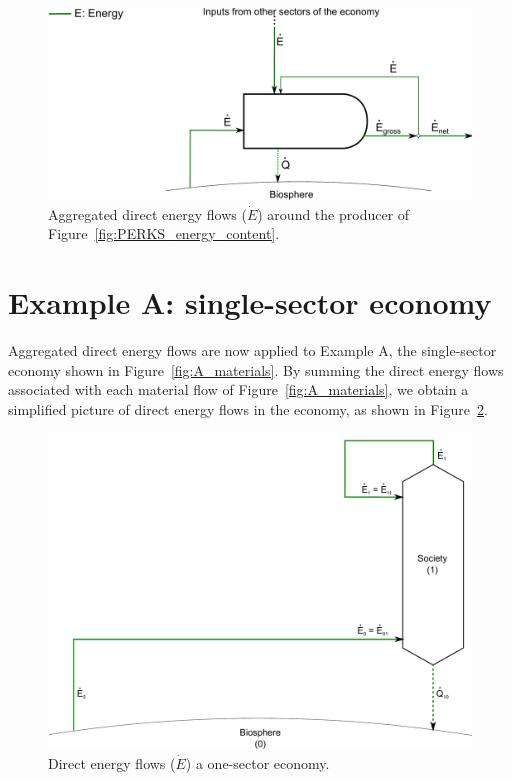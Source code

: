 \begin{figure}[!ht]
\centering
\includegraphics[width=\linewidth]{Part_1/Chapter_Energy/images/PERKS_basic_unit_energy.pdf}
\caption[Aggregated direct energy flows for a single sector]{Aggregated direct energy flows ($\dot{E}$) around 
the producer of Figure~\ref{fig:PERKS_energy_content}.}
\label{fig:PERKS_energy}
\end{figure}


\section{Example A: single-sector economy} %
\label{sec:A_energy}

Aggregated direct energy flows are now applied to Example A, 
the single-sector economy shown in Figure~\ref{fig:A_materials}.
By summing the direct energy flows associated with
each material flow of Figure~\ref{fig:A_materials}, we obtain
a simplified picture of direct energy flows in the economy,
as shown in Figure~\ref{fig:A_energy}.

\begin{landscape}
\begin{figure}[!ht]
\centering
\includegraphics[width=0.8\linewidth]{Part_1/Chapter_Energy/images/1_sector_direct_energy.pdf}
\caption[Direct energy flows a one-sector economy]{Direct energy flows ($\dot{E}$) a one-sector economy.}
\label{fig:A_energy}
\end{figure}
\end{landscape}

